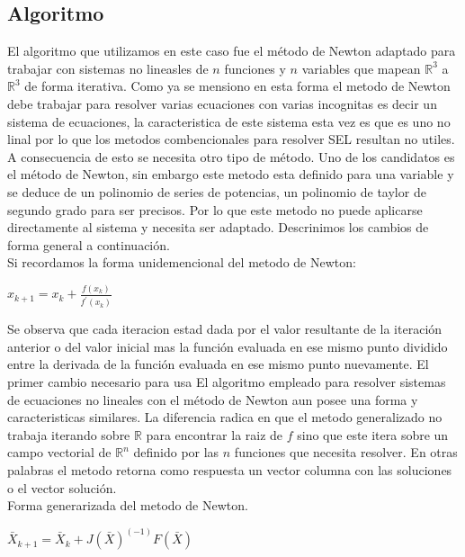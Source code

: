 \documentclass[11pt]{article}
\begin{document}
\subsection{Algoritmo}
El algoritmo que utilizamos en este caso fue el  método de Newton adaptado para trabajar con sistemas no lineasles de $n$ funciones y $n$ variables que mapean $\mathbb{R}^3$ a $\mathbb{R}^3$ de forma iterativa. Como ya se mensiono en esta forma el metodo de Newton debe trabajar para resolver varias ecuaciones con varias incognitas es decir un sistema de ecuaciones, la caracteristica de este sistema esta vez es que es uno no linal por lo que los metodos combencionales para resolver SEL resultan no utiles. A consecuencia de esto se necesita otro tipo de método. Uno de los candidatos es el método de Newton, sin embargo este metodo esta definido para una variable y se deduce de un polinomio de series de potencias, un polinomio de taylor de segundo grado para ser precisos. Por lo que este metodo no puede aplicarse directamente al sistema y  necesita ser adaptado. Descrinimos los cambios de forma general a continuación.\\

Si recordamos la forma unidemencional del metodo de Newton:\\
\begin{center}
$x_{k+1} = x_{k} + \frac{f(x_{k})}{f^\prime(x_{k})} \label{eq:1}$\\
\end{center}

Se observa que cada iteracion estad dada por el valor resultante de la iteración anterior o del valor inicial mas la función evaluada en ese mismo punto dividido entre la derivada de la función evaluada en ese mismo punto nuevamente. El primer cambio necesario para usa 
 El algoritmo empleado para resolver sistemas de ecuaciones no lineales con el método de Newton aun posee una forma y caracteristicas similares. La diferencia radica en que el metodo generalizado no trabaja iterando sobre $\mathbb{R}$ para encontrar la raiz de $f$ sino que este itera sobre un campo vectorial de $\mathbb{R}^n$ definido por las $n$ funciones que necesita resolver. En otras palabras el metodo retorna como respuesta un vector columna con las soluciones o el vector solución.\\

Forma generarizada del metodo de Newton.
 
\begin{center}
$\bar{X}_{k+1} = \bar{X}_{k} + J(\bar{X})^(-1)F(\bar{X})  \label{eq:2}$
\end{center}
\end{document}
